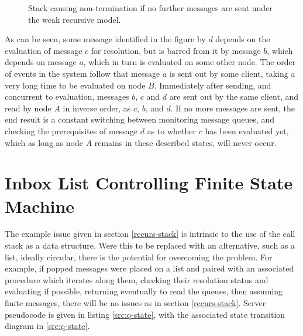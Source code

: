 \documentclass[a4paper,10pt]{article}
\begin{document}
\begin{figure}
	\centering
	\begin{drawstack}
		\startframe
		\startframe
		\startframe
	\end{drawstack}
	\caption{\label{fig:deps-block-stack}Stack causing non-termination if
	no further messages are sent under the weak recursive model.} 
\end{figure}

As can be seen, some message identified in the figure by \(d\) depends on the
evaluation of message \(c\) for resolution, but is barred from it by message
\(b\), which depends on message \(a\), which in turn is evaluated on some other
node.
The order of events in the system follow that message \(a\) is sent out by some
client, taking a very long time to be evaluated on node \(B\).
Immediately after sending, and concurrent to evaluation, messages \(b\), \(c\)
and \(d\) are sent out by the same client, and read by node \(A\) in inverse
order, as \(c\), \(b\), and \(d\).
If no more messages are sent, the end result is a constant switching between
monitoring message queues, and checking the prerequisites of message \(d\) as
to whether \(c\) has been evaluated yet, which as long as node \(A\) remains in
these described states, will never occur.

\section{Inbox List Controlling Finite State Machine}
\label{inbox-list}

The example issue given in section \ref{recurs-stack} is intrinsic to the use
of the call stack as a data structure.
Were this to be replaced with an alternative, such as a list, ideally circular,
there is the potential for overcoming the problem.
For example, if popped messages were placed on a list and paired with an
associated procedure which iterates along them, checking their resolution
status and evaluating if possible, returning eventually to read the queues,
then assuming finite messages, there will be no issues as in section
\ref{recurs-stack}.
Server pseudocode is given in listing \ref{src:q-state}, with the associated
state transition diagram in \ref{src:q-state}.
\end{document}
